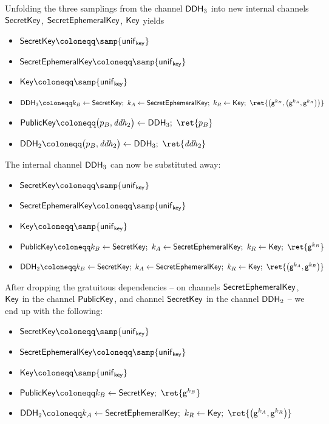 \noindent Unfolding the three samplings from the channel $\mathsf{DDH}_3$ into new internal channels $\mathsf{SecretKey}$, $\mathsf{SecretEphemeralKey}$, $\mathsf{Key}$ yields

\begin{itemize}
\item {\color{red} $\SecretKey \coloneqq \samp{\unif_\key}$}
\item {\color{red} $\SecretEphemeralKey \coloneqq \samp{\unif_\key}$}
\item {\color{red} $\Key \coloneqq \samp{\unif_\key}$}
\item {\color{red} $\DDH_3 \coloneqq k_B \leftarrow \SecretKey; \ k_A \leftarrow \SecretEphemeralKey; \ k_R \leftarrow \Key; \ \ret{\big(\gen^{k_B}, \big(\gen^{k_A}, \gen^{k_R}\big)\big)}$}
\item $\PublicKey \coloneqq \big(p_B, \mathit{ddh}_2\big) \leftarrow \DDH_3; \ \ret{p_B}$
\item $\DDH_2 \coloneqq \big(p_B, \mathit{ddh}_2\big) \leftarrow \DDH_3; \ \ret{\mathit{ddh}_2}$
\end{itemize}

\noindent The internal channel $\mathsf{DDH}_3$ can now be substituted away:

\begin{itemize}
\item $\SecretKey \coloneqq \samp{\unif_\key}$
\item $\SecretEphemeralKey \coloneqq \samp{\unif_\key}$
\item $\Key \coloneqq \samp{\unif_\key}$
\item {\color{red} $\PublicKey \coloneqq k_B \leftarrow \SecretKey; \ k_A \leftarrow \SecretEphemeralKey; \ k_R \leftarrow \Key; \ \ret{\gen^{k_B}}$}
\item {\color{red} $\DDH_2 \coloneqq k_B \leftarrow \SecretKey; \ k_A \leftarrow \SecretEphemeralKey; \ k_R \leftarrow \Key; \ \ret{\big(\gen^{k_A}, \gen^{k_R}\big)}$}
\end{itemize}

\noindent After dropping the gratuitous dependencies -- on channels $\mathsf{SecretEphemeralKey}$, $\mathsf{Key}$ in the channel $\mathsf{PublicKey}$, and channel $\mathsf{SecretKey}$ in the channel $\mathsf{DDH}_2$ -- we end up with the following:

\begin{itemize}
\item $\SecretKey \coloneqq \samp{\unif_\key}$
\item $\SecretEphemeralKey \coloneqq \samp{\unif_\key}$
\item $\Key \coloneqq \samp{\unif_\key}$
\item {\color{red} $\PublicKey \coloneqq k_B \leftarrow \SecretKey; \ \ret{\gen^{k_B}}$}
\item {\color{red} $\DDH_2 \coloneqq k_A \leftarrow \SecretEphemeralKey; \ k_R \leftarrow \Key; \ \ret{\big(\gen^{k_A}, \gen^{k_R}\big)}$}
\end{itemize}

